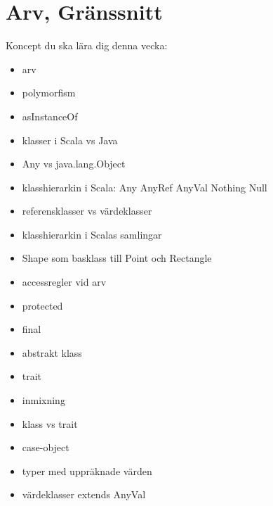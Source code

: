 \chapter{Arv, Gränssnitt}\label{chapter:W07}
Koncept du ska lära dig denna vecka:
\begin{multicols}{2}\begin{itemize}[nosep,label={$\square$},leftmargin=*]
\item arv
\item polymorfism
\item asInstanceOf
\item klasser i Scala vs Java
\item Any vs java.lang.Object
\item klasshierarkin i Scala: Any AnyRef AnyVal Nothing Null
\item referensklasser vs värdeklasser
\item klasshierarkin i Scalas samlingar
\item Shape som basklass till Point och Rectangle
\item accessregler vid arv
\item protected
\item final
\item abstrakt klass
\item trait
\item inmixning
\item klass vs trait
\item case-object
\item typer med uppräknade värden
\item värdeklasser extends AnyVal\end{itemize}\end{multicols}
